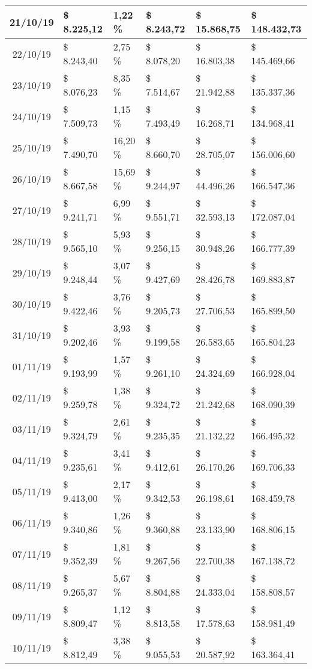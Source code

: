 \begin{small}
\begin{longtable}{|c|l|l|l|l|l|}
21/10/19 & \$ 8.225,12 & 1,22 \% & \$ 8.243,72 & \$ 15.868,75 & \$ 148.432,73 \\ \hline
22/10/19 & \$ 8.243,40 & 2,75 \% & \$ 8.078,20 & \$ 16.803,38 & \$ 145.469,66 \\ \hline
23/10/19 & \$ 8.076,23 & 8,35 \% & \$ 7.514,67 & \$ 21.942,88 & \$ 135.337,36 \\ \hline
24/10/19 & \$ 7.509,73 & 1,15 \% & \$ 7.493,49 & \$ 16.268,71 & \$ 134.968,41 \\ \hline
25/10/19 & \$ 7.490,70 & 16,20 \% & \$ 8.660,70 & \$ 28.705,07 & \$ 156.006,60 \\ \hline
26/10/19 & \$ 8.667,58 & 15,69 \% & \$ 9.244,97 & \$ 44.496,26 & \$ 166.547,36 \\ \hline
27/10/19 & \$ 9.241,71 & 6,99 \% & \$ 9.551,71 & \$ 32.593,13 & \$ 172.087,04 \\ \hline
28/10/19 & \$ 9.565,10 & 5,93 \% & \$ 9.256,15 & \$ 30.948,26 & \$ 166.777,39 \\ \hline
29/10/19 & \$ 9.248,44 & 3,07 \% & \$ 9.427,69 & \$ 28.426,78 & \$ 169.883,87 \\ \hline
30/10/19 & \$ 9.422,46 & 3,76 \% & \$ 9.205,73 & \$ 27.706,53 & \$ 165.899,50 \\ \hline
31/10/19 & \$ 9.202,46 & 3,93 \% & \$ 9.199,58 & \$ 26.583,65 & \$ 165.804,23 \\ \hline
01/11/19 & \$ 9.193,99 & 1,57 \% & \$ 9.261,10 & \$ 24.324,69 & \$ 166.928,04 \\ \hline
02/11/19 & \$ 9.259,78 & 1,38 \% & \$ 9.324,72 & \$ 21.242,68 & \$ 168.090,39 \\ \hline
03/11/19 & \$ 9.324,79 & 2,61 \% & \$ 9.235,35 & \$ 21.132,22 & \$ 166.495,32 \\ \hline
04/11/19 & \$ 9.235,61 & 3,41 \% & \$ 9.412,61 & \$ 26.170,26 & \$ 169.706,33 \\ \hline
05/11/19 & \$ 9.413,00 & 2,17 \% & \$ 9.342,53 & \$ 26.198,61 & \$ 168.459,78 \\ \hline
06/11/19 & \$ 9.340,86 & 1,26 \% & \$ 9.360,88 & \$ 23.133,90 & \$ 168.806,15 \\ \hline
07/11/19 & \$ 9.352,39 & 1,81 \% & \$ 9.267,56 & \$ 22.700,38 & \$ 167.138,72 \\ \hline
08/11/19 & \$ 9.265,37 & 5,67 \% & \$ 8.804,88 & \$ 24.333,04 & \$ 158.808,57 \\ \hline
09/11/19 & \$ 8.809,47 & 1,12 \% & \$ 8.813,58 & \$ 17.578,63 & \$ 158.981,49 \\ \hline
10/11/19 & \$ 8.812,49 & 3,38 \% & \$ 9.055,53 & \$ 20.587,92 & \$ 163.364,41 \\ \hline

\end{longtable}
\end{small}
